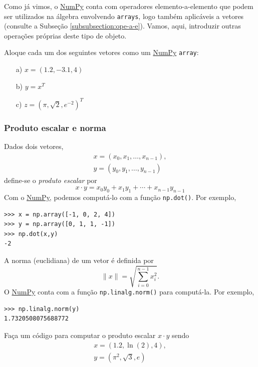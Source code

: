 \documentclass[12pt]{article}
\begin{document}
Como já vimos, o \href{https://numpy.org/}{NumPy} conta com operadores elemento-a-elemento que podem ser utilizados na álgebra envolvendo \lstinline+arrays+, logo também aplicáveis a vetores (consulte a Subseção \ref{subsubsection:ope-a-e}). Vamos, aqui, introduzir outras operações próprias deste tipo de objeto.

\begin{exr}
  Aloque cada um dos seguintes vetores como um \href{https://numpy.org/}{NumPy} \lstinline+array+:
  \begin{enumerate}
  \item[a)] $x = (1.2, -3.1, 4)$
  \item[b)] $y = x^T$
  \item[c)] $z = (\pi, \sqrt{2}, e^{-2})^T$
  \end{enumerate}
\end{exr}

\subsubsection{Produto escalar e norma}

Dados dois vetores,
\begin{gather}
  x = (x_0, x_1, \dotsc, x_{n-1}),\\
  y = (y_0, y_1, \dotsc, y_{n-1})
\end{gather}
define-se o \emph{produto escalar} por
\begin{equation}
  x\cdot y = x_0y_0 + x_1y_1 + \cdots + x_{n-1}y_{n-1}
\end{equation}
Com o \href{https://numpy.org/}{NumPy}, podemos computá-lo com a função \lstinline+np.dot()+. Por exemplo,

\begin{lstlisting}
>>> x = np.array([-1, 0, 2, 4])
>>> y = np.array([0, 1, 1, -1])
>>> np.dot(x,y)
-2
\end{lstlisting}

A norma (euclidiana) de um vetor é definida por
\begin{equation}
  \|x\| = \sqrt{\sum_{i=0}^{n-1} x_i^2}.
\end{equation}
O \href{https://numpy.org/}{NumPy} conta com a função \lstinline+np.linalg.norm()+ para computá-la. Por exemplo,

\begin{lstlisting}
>>> np.linalg.norm(y)
1.7320508075688772
\end{lstlisting}

\begin{exr}
  Faça um código para computar o produto escalar $x\cdot y$ sendo
  \begin{gather}
    x = (1.2, \ln(2), 4),\\
    y = (\pi^2, \sqrt{3}, e)
  \end{gather}
\end{exr}
\end{document}
